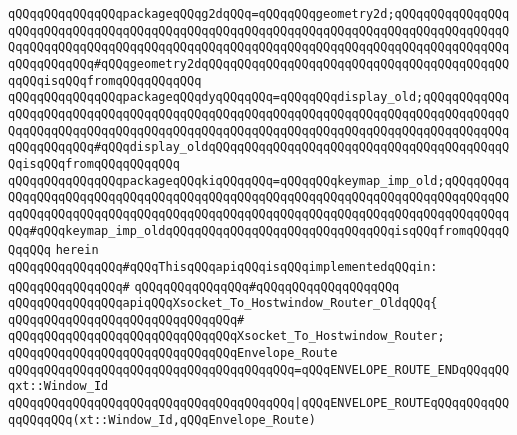 \verb|qQQqqQQqqQQqqQQqpackageqQQqg2dqQQq=qQQqqQQqgeometry2d;qQQqqQQqqQQqqQQqqQQqqQQqqQQqqQQqqQQqqQQqqQQqqQQqqQQqqQQqqQQqqQQqqQQqqQQqqQQqqQQqqQQqqQQqqQQqqQQqqQQqqQQqqQQqqQQqqQQqqQQqqQQqqQQqqQQqqQQqqQQqqQQqqQQqqQQqqQQqqQQqqQQqqQQq#qQQqgeometry2dqQQqqQQqqQQqqQQqqQQqqQQqqQQqqQQqqQQqqQQqqQQqqQQqisqQQqfromqQQqqQQqqQQq|\newline
\verb|qQQqqQQqqQQqqQQqpackageqQQqdyqQQqqQQq=qQQqqQQqdisplay_old;qQQqqQQqqQQqqQQqqQQqqQQqqQQqqQQqqQQqqQQqqQQqqQQqqQQqqQQqqQQqqQQqqQQqqQQqqQQqqQQqqQQqqQQqqQQqqQQqqQQqqQQqqQQqqQQqqQQqqQQqqQQqqQQqqQQqqQQqqQQqqQQqqQQqqQQqqQQqqQQqqQQq#qQQqdisplay_oldqQQqqQQqqQQqqQQqqQQqqQQqqQQqqQQqqQQqqQQqqQQqisqQQqfromqQQqqQQqqQQq|\newline
\verb|qQQqqQQqqQQqqQQqpackageqQQqkiqQQqqQQq=qQQqqQQqkeymap_imp_old;qQQqqQQqqQQqqQQqqQQqqQQqqQQqqQQqqQQqqQQqqQQqqQQqqQQqqQQqqQQqqQQqqQQqqQQqqQQqqQQqqQQqqQQqqQQqqQQqqQQqqQQqqQQqqQQqqQQqqQQqqQQqqQQqqQQqqQQqqQQqqQQqqQQqqQQq#qQQqkeymap_imp_oldqQQqqQQqqQQqqQQqqQQqqQQqqQQqqQQqisqQQqfromqQQqqQQqqQQq|\newline
\verb|herein|\newline
\newline
\verb|qQQqqQQqqQQqqQQq#qQQqThisqQQqapiqQQqisqQQqimplementedqQQqin:|\newline
\verb|qQQqqQQqqQQqqQQq#|\newline
\verb|qQQqqQQqqQQqqQQq#qQQqqQQqqQQqqQQqqQQq|\newline
\newline
\verb|qQQqqQQqqQQqqQQqapiqQQqXsocket_To_Hostwindow_Router_OldqQQq{|\newline
\verb|qQQqqQQqqQQqqQQqqQQqqQQqqQQqqQQq#|\newline
\verb|qQQqqQQqqQQqqQQqqQQqqQQqqQQqqQQqXsocket_To_Hostwindow_Router;|\newline
\newline
\verb|qQQqqQQqqQQqqQQqqQQqqQQqqQQqqQQqEnvelope_Route|\newline
\verb|qQQqqQQqqQQqqQQqqQQqqQQqqQQqqQQqqQQqqQQq=qQQqENVELOPE_ROUTE_ENDqQQqqQQqxt::Window_Id|\newline
\verb|qQQqqQQqqQQqqQQqqQQqqQQqqQQqqQQqqQQqqQQq|\verb#|qQQqENVELOPE_ROUTEqQQqqQQqqQQqqQQqqQQq(xt::Window_Id,qQQqEnvelope_Route)#\newline
